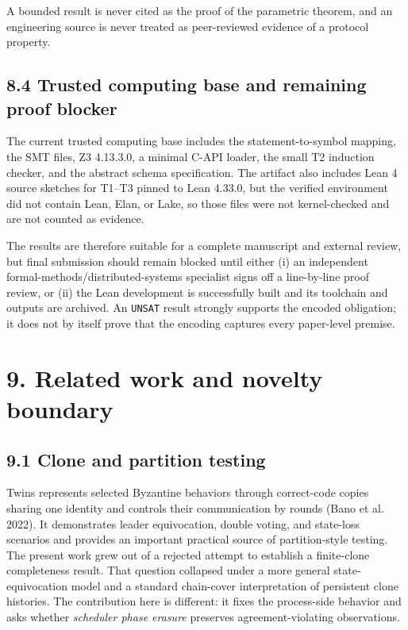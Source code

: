 \documentclass[10pt,a4paper]{article}
\begin{document}
A bounded result is never cited as the proof of the parametric theorem,
and an engineering source is never treated as peer-reviewed evidence of
a protocol property.

\subsection{8.4 Trusted computing base and remaining proof
blocker}\label{trusted-computing-base-and-remaining-proof-blocker}

The current trusted computing base includes the statement-to-symbol
mapping, the SMT files, Z3 4.13.3.0, a minimal C-API loader, the small
T2 induction checker, and the abstract schema specification. The
artifact also includes Lean 4 source sketches for T1--T3 pinned to Lean
4.33.0, but the verified environment did not contain Lean, Elan, or
Lake, so those files were not kernel-checked and are not counted as
evidence.

The results are therefore suitable for a complete manuscript and
external review, but final submission should remain blocked until either
(i) an independent formal-methods/distributed-systems specialist signs
off a line-by-line proof review, or (ii) the Lean development is
successfully built and its toolchain and outputs are archived. An
\texttt{UNSAT} result strongly supports the encoded obligation; it does
not by itself prove that the encoding captures every paper-level
premise.

\section{9. Related work and novelty
boundary}\label{related-work-and-novelty-boundary}

\subsection{9.1 Clone and partition
testing}\label{clone-and-partition-testing}

Twins represents selected Byzantine behaviors through correct-code
copies sharing one identity and controls their communication by rounds
(Bano et al. 2022). It demonstrates leader equivocation, double voting,
and state-loss scenarios and provides an important practical source of
partition-style testing. The present work grew out of a rejected attempt
to establish a finite-clone completeness result. That question collapsed
under a more general state-equivocation model and a standard chain-cover
interpretation of persistent clone histories. The contribution here is
different: it fixes the process-side behavior and asks whether
\emph{scheduler phase erasure} preserves agreement-violating
observations.
\end{document}
